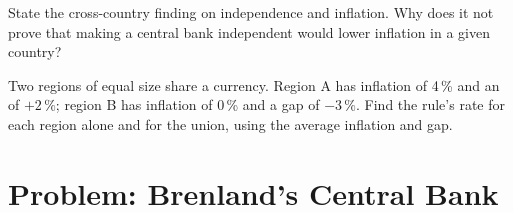 \begin{exercise}[$\star\star\star$]\label{exo:g12:monetary-policy:14}
State the cross-country finding on independence and inflation. Why does it not prove that making a central bank independent would lower inflation in a given country?
\end{exercise}

\begin{exercise}[$\star\star\star$]\label{exo:g12:monetary-policy:15}
Two regions of equal size share a currency. Region A has inflation of 4\,\% and an  of $+2\,\%$; region B has inflation of 0\,\% and a gap of $-3\,\%$. Find the rule's
rate for each region alone and for the union, using the average inflation and gap.
\end{exercise}

\section{Problem: Brenland's Central Bank}


